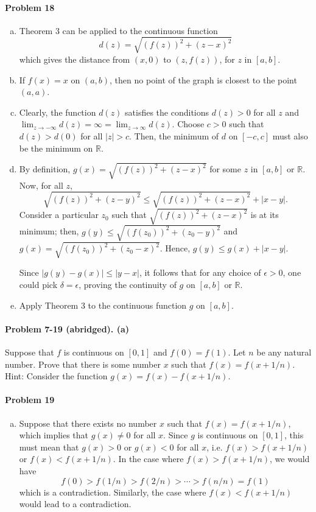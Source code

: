 \documentclass{article}
\begin{document}
\paragraph{Problem 18}
\begin{enumerate}[(a)]
  \item Theorem 3 can be applied to the continuous function \[
      d(z) = \sqrt{(f(z))^2 + (z - x)^2}
    \] which gives the distance from $(x, 0)$ to $(z, f(z))$, for $z$ in
    $[a, b]$.
  \item If $f(x) = x$ on $(a, b)$, then no point of the graph is closest to the
    point $(a, a)$.
  \item Clearly, the function $d(z)$ satisfies the conditions $d(z) > 0$ for
    all $z$ and $\lim_{z \to -\infty} d(z) = \infty = \lim_{z \to \infty}
    d(z)$. Choose $c > 0$ such that $d(z) > d(0)$ for all $|z| > c$. Then, the
    minimum of $d$ on $[-c, c]$ must also be the minimum on $\mathbb{R}$.
  \item By definition, $g(x) = \sqrt{(f(z))^2 + (z - x)^2}$ for some $z$ in
    $[a, b]$ or $\mathbb{R}$. Now, for all $z$, \[
      \sqrt{(f(z))^2 + (z - y)^2} \leq \sqrt{(f(z))^2 + (z - x)^2} + |x - y|.
    \] Consider a particular $z_0$ such that $\sqrt{(f(z))^2 + (z - x)^2}$ is
    at its minimum; then, $g(y) \leq \sqrt{(f(z_0))^2 + (z_0 - y)^2}$ and $g(x)
    = \sqrt{(f(z_0))^2 + (z_0 - x)^2}$. Hence, $g(y) \leq g(x) + |x - y|$.

    Since $|g(y) - g(x)| \leq |y - x|$, it follows that for any choice of
    $\epsilon > 0$, one could pick $\delta = \epsilon$, proving the continuity
    of $g$ on $[a, b]$ or $\mathbb{R}$.
  \item Apply Theorem 3 to the continuous function $g$ on $[a, b]$.
\end{enumerate}

\paragraph{Problem 7-19 (abridged). (a)} Suppose that $f$ is continuous on $[0,
1]$ and $f(0) = f(1)$. Let $n$ be any natural number. Prove that there is some
number $x$ such that $f(x) = f(x + 1/n)$. Hint: Consider the function $g(x) =
f(x) - f(x + 1/n)$.

\paragraph{Problem 19}
\begin{enumerate}[(a)]
  \item Suppose that there exists no number $x$ such that $f(x) = f(x + 1/n)$,
    which implies that $g(x) \neq 0$ for all $x$. Since $g$ is continuous on
    $[0, 1]$, this must mean that $g(x) > 0$ or $g(x) < 0$ for all $x$, i.e.
    $f(x) > f(x + 1/n)$ or $f(x) < f(x + 1/n)$. In the case where $f(x) >
    f(x + 1/n)$, we would have \[
      f(0) > f(1/n) > f(2/n) > \cdots > f(n/n) = f(1)
    \] which is a contradiction. Similarly, the case where $f(x) < f(x + 1/n)$
    would lead to a contradiction.
\end{enumerate}
\end{document}
